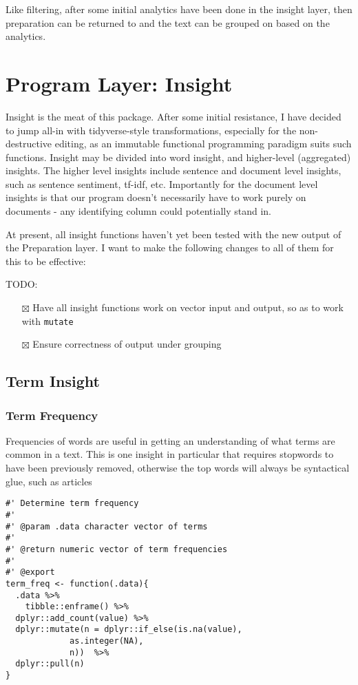 \documentclass[a4paper, 11pt]{article}
\begin{document}
Like filtering, after some initial analytics have been done in the
insight layer, then preparation can be returned to and the text can be
grouped on based on the analytics.
\section{Program Layer: Insight}
\label{sec:orgaf9163e}
Insight is the meat of this package. After some initial resistance, I
have decided to jump all-in with tidyverse-style transformations,
especially for the non-destructive editing, as an immutable functional
programming paradigm suits such functions. Insight may be divided into
word insight, and higher-level (aggregated) insights. The higher level
insights include sentence and document level insights, such as
sentence sentiment, tf-idf, etc. Importantly for the document level
insights is that our program doesn't necessarily have to work purely
on documents - any identifying column could potentially stand in.

At present, all insight functions haven't yet been tested with the new
output of the Preparation layer. I want to make the following changes
to all of them for this to be effective:

TODO:
\begin{itemize}
\item[{$\boxtimes$}] Have all insight functions work on vector input and output, so
as to work with \texttt{mutate}
\item[{$\boxtimes$}] Ensure correctness of output under grouping
\end{itemize}
\subsection{Term Insight}
\label{sec:orgd6bc3e3}
\subsubsection{Term Frequency}
\label{sec:org4a504ab}
Frequencies of words are useful in getting an understanding of what
terms are common in a text. This is one insight in particular that
requires stopwords to have been previously removed, otherwise the top
words will always be syntactical glue, such as articles
\begin{verbatim}
#' Determine term frequency
#'
#' @param .data character vector of terms
#'
#' @return numeric vector of term frequencies
#'
#' @export
term_freq <- function(.data){
  .data %>%
    tibble::enframe() %>%
  dplyr::add_count(value) %>%
  dplyr::mutate(n = dplyr::if_else(is.na(value),
		     as.integer(NA),
		     n))  %>%
  dplyr::pull(n)
}
\end{verbatim}
\end{document}
